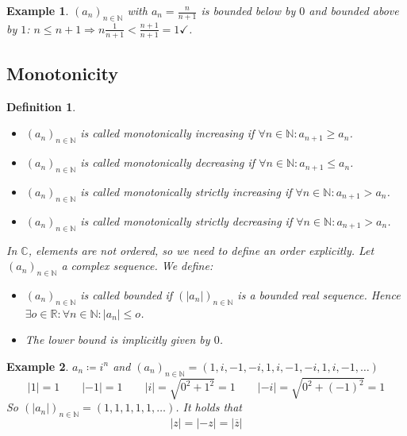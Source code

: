 \documentclass[a4paper,landscape,twocolumn]{article}
\newtheorem{defi}{Definition}
\newtheorem{ex}{Example}
\newcommand\abs[1]{\left|#1\right|}
\begin{document}
\begin{ex}
  $(a_n)_{n \in \mathbb N}$ with $a_n = \frac{n}{n+1}$ is bounded below by $0$
  and bounded above by $1$: $n \leq n+1 \Rightarrow n \frac{1}{n+1} < \frac{n+1}{n+1} = 1 \checkmark$.
\end{ex}

\subsection{Monotonicity}
\begin{defi}\hfill{}
  \begin{itemize}
    \item $(a_n)_{n \in \mathbb N}$ is called \emph{monotonically increasing} if $\forall n \in \mathbb N: a_{n+1} \geq a_n$.
    \item $(a_n)_{n \in \mathbb N}$ is called \emph{monotonically decreasing} if $\forall n \in \mathbb N: a_{n+1} \leq a_n$.
    \item $(a_n)_{n \in \mathbb N}$ is called \emph{monotonically strictly increasing} if $\forall n \in \mathbb N: a_{n+1} > a_n$.
    \item $(a_n)_{n \in \mathbb N}$ is called \emph{monotonically strictly decreasing} if $\forall n \in \mathbb N: a_{n+1} > a_n$.
  \end{itemize}
  In $\mathbb C$, elements are not ordered, so we need to define an order explicitly.
  Let $(a_n)_{n \in \mathbb N}$ a complex sequence. We define:
  \begin{itemize}
    \item $(a_n)_{n \in \mathbb N}$ is called bounded if $(\abs{a_n})_{n \in \mathbb N}$ is a bounded real sequence.
    Hence $\exists o \in \mathbb R: \forall n \in \mathbb N: \abs{a_n} \leq o$.
    \item The lower bound is implicitly given by $0$.
  \end{itemize}
\end{defi}

\begin{ex}
  $a_n \coloneqq i^n$ and $(a_n)_{n \in \mathbb N} = (1, i, -1, -i, 1, i, -1, -i, 1, i, -1, \dots)$
  \[ \abs{1} = 1 \qquad \abs{-1} = 1 \qquad \abs{i} = \sqrt{0^2 + 1^2} = 1 \qquad \abs{-i} = \sqrt{0^2 + (-1)^2} = 1 \]
  So $\left(\abs{a_n}\right)_{n \in \mathbb N} = (1, 1, 1, 1, 1, \dots)$.
  It holds that
  \[ \abs{z} = \abs{-z} = \abs{\overline{z}} \]
\end{ex}
\end{document}

